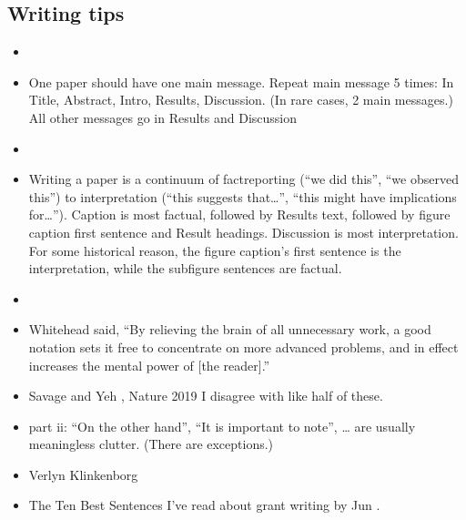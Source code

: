 \documentclass[letterpaper,10pt,english]{sphinxmanual}
\begin{document}
\subsection{Writing tips}
\label{\detokenize{PaperWritingTips:writing-tips}}\begin{itemize}
\item {} 
\sphinxAtStartPar
{}

\item {} 
\sphinxAtStartPar
One paper should have one main message. Repeat main message 5 times: In Title, Abstract, Intro, Results, Discussion. (In rare cases, 2 main messages.) All other messages go in Results and Discussion

\item {} 
\sphinxAtStartPar
{}

\item {} 
\sphinxAtStartPar
Writing a paper is a continuum of fact\sphinxhyphen{}reporting (“we did this”, “we observed this”) to interpretation (“this suggests that…”, “this might have implications for…”). Caption is most factual, followed by Results text, followed by figure caption first sentence and Result headings. Discussion is most interpretation. For some historical reason, the figure caption’s first sentence is the interpretation, while the subfigure sentences are factual.

\item {} 
\sphinxAtStartPar
{}

\item {} 
\sphinxAtStartPar
Whitehead said, “By relieving the brain of all unnecessary work, a good notation sets it free to concentrate on more advanced problems, and in effect increases the mental power of {[}the reader{]}.”

\item {} 
\sphinxAtStartPar
Savage and Yeh , Nature 2019 I disagree with like half of these.

\item {} 
\sphinxAtStartPar
{} part ii: “On the other hand”, “It is important to note”, … are usually meaningless clutter. (There are exceptions.)

\item {} 
\sphinxAtStartPar
Verlyn Klinkenborg 

\item {} 
\sphinxAtStartPar
The Ten Best Sentences I’ve read about grant writing by Jun .

\end{itemize}
\end{document}
